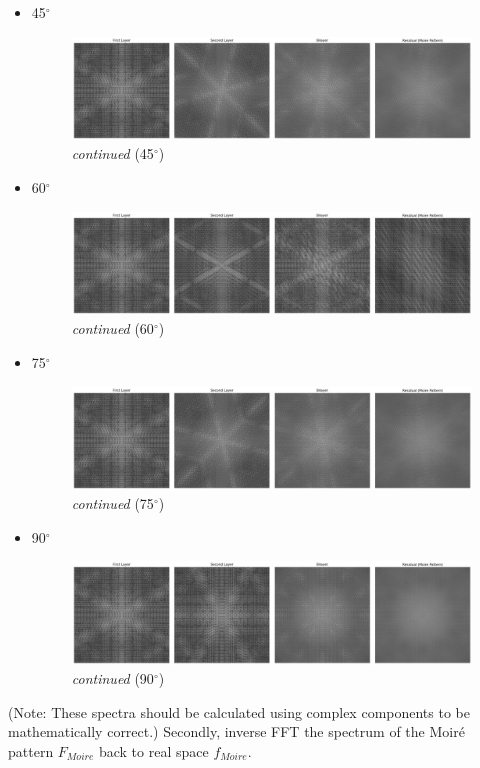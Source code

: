 \documentclass[12pt,a4paper]{article}
\begin{document}
\begin{CJK}{UTF8}{bkai}
\begin{itemize}
    \item 45$^\circ$
    \begin{figure}[h]
        \centering
        \includegraphics[width=0.95\linewidth]{figures/45degree_fft.png}
        \caption{\textit{continued} (45$^\circ$)}
        \label{fig:moire_45_fft}
    \end{figure}
    \clearpage
    \item 60$^\circ$
    \begin{figure}[h]
        \centering
        \includegraphics[width=0.95\linewidth]{figures/60degree_fft.png}
        \caption{\textit{continued} (60$^\circ$)}
        \label{fig:moire_60_fft}
    \end{figure}
    \item 75$^\circ$
    \begin{figure}[h]
        \centering
        \includegraphics[width=0.95\linewidth]{figures/75degree_fft.png}
        \caption{\textit{continued} (75$^\circ$)}
        \label{fig:moire_75_fft}
    \end{figure}
    \item 90$^\circ$
    \begin{figure}[h]
        \centering
        \includegraphics[width=0.95\linewidth]{figures/90degree_fft.png}
        \caption{\textit{continued} (90$^\circ$)}
        \label{fig:moire_90_fft}
    \end{figure}
\end{itemize}
(Note: These spectra should be calculated using complex components to be mathematically correct.)
\clearpage
Secondly, inverse FFT the spectrum of the Moiré pattern $F_{Moire}$ back to real space $f_{Moire}$.


\end{CJK}
\end{document}
